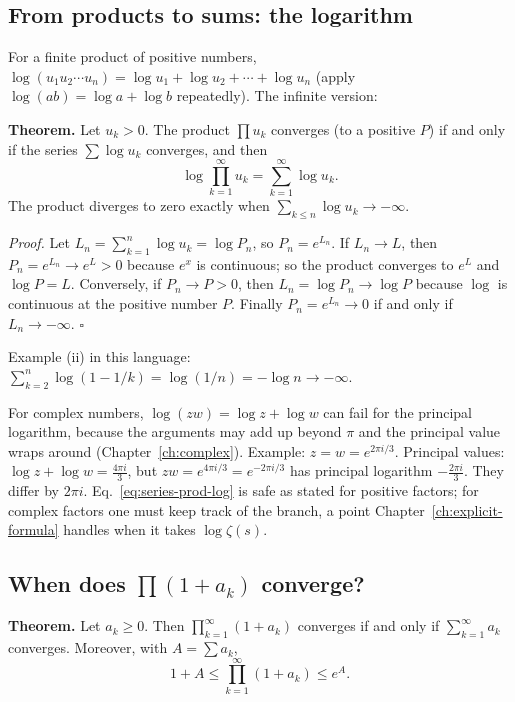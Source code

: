 \subsection{From products to sums: the logarithm}

For a finite product of positive numbers, $\log(u_1u_2\cdots u_n)=\log u_1+\log u_2+\cdots+\log u_n$ (apply $\log(ab)=\log a+\log b$ repeatedly). The infinite version:

\textbf{Theorem.} Let $u_k>0$. The product $\prod u_k$ converges (to a positive $P$) if and only if the series $\sum\log u_k$ converges, and then
\begin{equation}
\log\prod_{k=1}^\infty u_k=\sum_{k=1}^\infty\log u_k .
\label{eq:series-prod-log}
\end{equation}
The product diverges to zero exactly when $\sum_{k\le n}\log u_k\to-\infty$.

\emph{Proof.} Let $L_n=\sum_{k=1}^n\log u_k=\log P_n$, so $P_n=e^{L_n}$. If $L_n\to L$, then $P_n=e^{L_n}\to e^{L}>0$ because $e^x$ is continuous; so the product converges to $e^L$ and $\log P=L$. Conversely, if $P_n\to P>0$, then $L_n=\log P_n\to\log P$ because $\log$ is continuous at the positive number $P$. Finally $P_n=e^{L_n}\to0$ if and only if $L_n\to-\infty$. $\square$

Example (ii) in this language: $\sum_{k=2}^n\log(1-1/k)=\log(1/n)=-\log n\to-\infty$.

\begin{pitfall}
For complex numbers, $\log(zw)=\log z+\log w$ can fail for the principal logarithm, because the arguments may add up beyond $\pi$ and the principal value wraps around (Chapter~\ref{ch:complex}). Example: $z=w=e^{2\pi i/3}$. Principal values: $\log z+\log w=\tfrac{4\pi i}3$, but $zw=e^{4\pi i/3}=e^{-2\pi i/3}$ has principal logarithm $-\tfrac{2\pi i}3$. They differ by $2\pi i$. Eq.~\eqref{eq:series-prod-log} is safe as stated for positive factors; for complex factors one must keep track of the branch, a point Chapter~\ref{ch:explicit-formula} handles when it takes $\log\zeta(s)$.
\end{pitfall}

\subsection{When does $\prod(1+a_k)$ converge?}

\textbf{Theorem.} Let $a_k\ge0$. Then $\prod_{k=1}^\infty(1+a_k)$ converges if and only if $\sum_{k=1}^\infty a_k$ converges. Moreover, with $A=\sum a_k$,
\begin{equation}
1+A\le\prod_{k=1}^\infty(1+a_k)\le e^{A}.
\label{eq:series-prod-bounds}
\end{equation}

